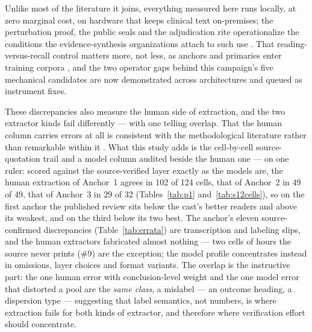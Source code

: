 \documentclass[11pt]{article}
\begin{document}
Unlike most of the literature it joins, everything measured here runs locally, at zero marginal cost, on hardware that keeps clinical text on-premises; the perturbation proof, the public seals and the adjudication rite operationalize the conditions the evidence-synthesis organizations attach to such use \citep{flemyng2025position}. That reading-versus-recall control matters more, not less, as anchors and primaries enter training corpora \citep{xu2024contamination}, and the two operator gaps behind this campaign's five mechanical candidates are now demonstrated across architectures and queued as instrument fixes.

These discrepancies also measure the human side of extraction, and the two extractor kinds fail differently --- with one telling overlap. That the human column carries errors at all is consistent with the methodological literature rather than remarkable within it \citep{gotzsche2007extraction,jones2005errors,tendal2011multiplicity,mathes2017frequency}. What this study adds is the cell-by-cell source-quotation trail and a model column audited beside the human one --- on one ruler: scored against the source-verified layer exactly as the models are, the human extraction of Anchor~1 agrees in 102 of 124 cells, that of Anchor~2 in 49 of 49, that of Anchor~3 in 29 of 32 (Tables~\ref{tab:p1} and~\ref{tab:s12cells}), so on the first anchor the published review sits below the cast's better readers and above its weakest, and on the third below its two best. The anchor's eleven source-confirmed discrepancies (Table~\ref{tab:errata}) are transcription and labeling slips, and the human extractors fabricated almost nothing --- two cells of hours the source never prints (\#9) are the exception; the model profile concentrates instead in omissions, layer choices and format variants. The overlap is the instructive part: the one human error with conclusion-level weight and the one model error that distorted a pool are the \emph{same class}, a mislabel --- an outcome heading, a dispersion type --- suggesting that label semantics, not numbers, is where extraction fails for both kinds of extractor, and therefore where verification effort should concentrate.
\end{document}

